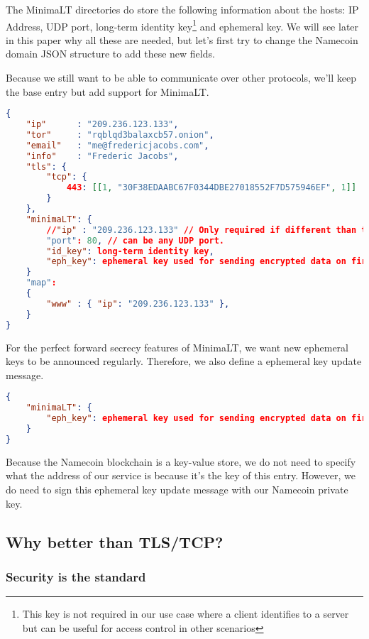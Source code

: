 \documentclass{vldb}
\begin{document}
The MinimaLT directories do store the following information about the hosts: IP Address, UDP port, long-term identity key\footnote{This key is not required in our use case where a client identifies to a server but can be useful for access control in other scenarios} and ephemeral key. We will see later in this paper why all these are needed, but let's first try to change the Namecoin domain JSON structure to add these new fields. 

Because we still want to be able to communicate over other protocols, we'll keep the base entry but add support for MinimaLT. 

\begin{lstlisting}[language=json,firstnumber=1]
{
    "ip"      : "209.236.123.133",
    "tor"     : "rqblqd3balaxcb57.onion",
    "email"   : "me@fredericjacobs.com",
    "info"    : "Frederic Jacobs",
    "tls": {
        "tcp": {
            443: [[1, "30F38EDAABC67F0344DBE27018552F7D575946EF", 1]]
        }
    },
    "minimaLT": {
        //"ip" : "209.236.123.133" // Only required if different than the default one
        "port": 80, // can be any UDP port.
        "id_key": long-term identity key,
        "eph_key": ephemeral key used for sending encrypted data on first RTT.
    }
    "map":
    {
        "www" : { "ip": "209.236.123.133" },
    }
}
\end{lstlisting}

For the perfect forward secrecy features of MinimaLT, we want new ephemeral keys to be announced regularly. Therefore, we also define a ephemeral key update message. 

\begin{lstlisting}[language=json,firstnumber=1]
{
    "minimaLT": {
        "eph_key": ephemeral key used for sending encrypted data on first RTT.
    }
}
\end{lstlisting}

Because the Namecoin blockchain is a key-value store, we do not need to specify what the address of our service is because it's the key of this entry. However, we do need to sign this ephemeral key update message with our Namecoin private key. 

\subsection{Why better than TLS/TCP?}

\subsubsection{Security is the standard}
\end{document}
